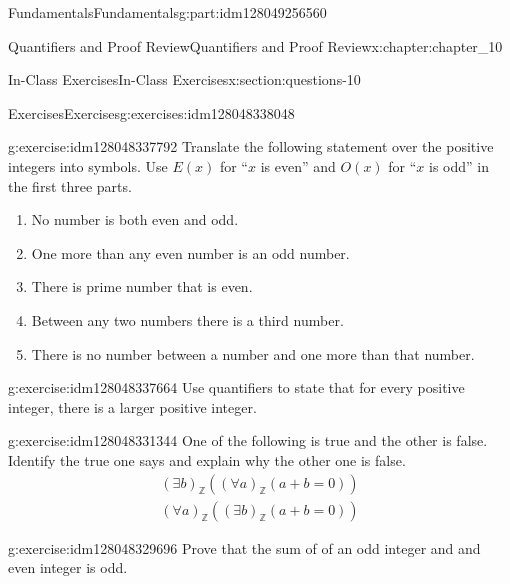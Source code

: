 \documentclass[oneside,10pt,]{book}
\numberwithin{equation}{section}
\begin{document}
\begin{partptx}{Fundamentals}{}{Fundamentals}{}{}{g:part:idm128049256560}
\begin{chapterptx}{Quantifiers and Proof Review}{}{Quantifiers and Proof Review}{}{}{x:chapter:chapter_10}
\typeout{************************************************}
%
\begin{sectionptx}{In-Class Exercises}{}{In-Class Exercises}{}{}{x:section:questions-10}
%
%
%
\typeout{************************************************}
\typeout{************************************************}
%
\begin{exercises-subsection}{Exercises}{}{Exercises}{}{}{g:exercises:idm128048338048}
\par\medskip\noindent%
%
\begin{exercisegroup}
\begin{divisionexerciseeg}{1}{}{}{g:exercise:idm128048337792}%
Translate the following statement over the positive integers into symbols. Use \(E(x)\) for ``\(x\) is even'' and \(O(x)\) for ``\(x\) is odd'' in the first three parts.%
\begin{enumerate}[label=(\alph*)]
\item{}No number is both even and odd.%
\item{}One more than any even number is an odd number.%
\item{}There is prime number that is even.%
\item{}Between any two numbers there is a third number.%
\item{}There is no number between a number and one more than that number.%
\end{enumerate}
%
\end{divisionexerciseeg}%
\begin{divisionexerciseeg}{2}{}{}{g:exercise:idm128048337664}%
Use quantifiers to state that for every positive integer, there is a larger positive integer.%
\end{divisionexerciseeg}%
\begin{divisionexerciseeg}{3}{}{}{g:exercise:idm128048331344}%
One of the following is true and the other is false.  Identify the true one says and explain why the other one is false.%
\begin{gather*}
(\exists  b)_{\mathbb{Z}} ((\forall a)_{\mathbb{Z}}(a + b = 0))\\
(\forall  a)_{\mathbb{Z}} ((\exists b)_{\mathbb{Z}}(a + b = 0))
\end{gather*}
%
\end{divisionexerciseeg}%
\begin{divisionexerciseeg}{4}{}{}{g:exercise:idm128048329696}%
Prove that the sum of of an odd integer and and even integer is odd.%
\end{divisionexerciseeg}%

\end{exercisegroup}
\end{exercises-subsection}
\end{sectionptx}
\end{chapterptx}
\end{partptx}
\end{document}
